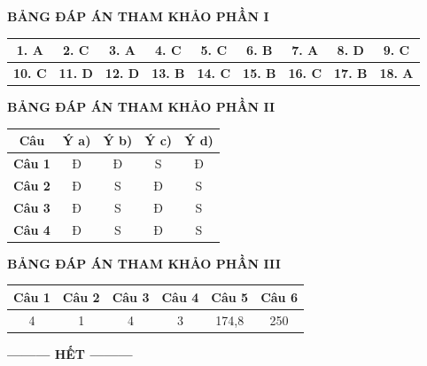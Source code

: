 \documentclass[12pt,a4paper]{article}
\begin{document}
\newpage
\noindent\textbf{\large BẢNG ĐÁP ÁN THAM KHẢO PHẦN I}
\vspace{0.2cm}

\begin{center}
\begin{tabular}{|c|c|c|c|c|c|c|c|c|}
\hline
\textbf{1. A} & \textbf{2. C} & \textbf{3. A} & \textbf{4. C} & \textbf{5. C} & \textbf{6. B} & \textbf{7. A} & \textbf{8. D} & \textbf{9. C} \\
\hline
\textbf{10. C} & \textbf{11. D} & \textbf{12. D} & \textbf{13. B} & \textbf{14. C} & \textbf{15. B} & \textbf{16. C} & \textbf{17. B} & \textbf{18. A} \\
\hline
\end{tabular}
\end{center}

\bigskip
\noindent\textbf{\large BẢNG ĐÁP ÁN THAM KHẢO PHẦN II}
\vspace{0.2cm}

\begin{center}
\begin{tabular}{|c|c|c|c|c|}
\hline
\textbf{Câu} & \textbf{Ý a)} & \textbf{Ý b)} & \textbf{Ý c)} & \textbf{Ý d)} \\
\hline
\textbf{Câu 1} & Đ & Đ & S & Đ \\
\hline
\textbf{Câu 2} & Đ & S & Đ & S \\
\hline
\textbf{Câu 3} & Đ & S & Đ & S \\
\hline
\textbf{Câu 4} & Đ & S & Đ & S \\
\hline
\end{tabular}
\end{center}

\bigskip
\noindent\textbf{\large BẢNG ĐÁP ÁN THAM KHẢO PHẦN III}
\vspace{0.2cm}

\begin{center}
\begin{tabular}{|c|c|c|c|c|c|}
\hline
\textbf{Câu 1} & \textbf{Câu 2} & \textbf{Câu 3} & \textbf{Câu 4} & \textbf{Câu 5} & \textbf{Câu 6} \\
\hline
4 & 1 & 4 & 3 & 174{,}8 & 250 \\
\hline
\end{tabular}
\end{center}

\begin{center}
\textbf{--------- HẾT ---------}
\end{center}
\end{document}
